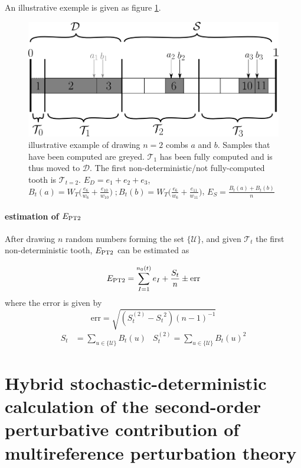 \documentclass[./thesis.tex]{subfiles}
\begin{document}
An illustrative exemple is given as figure \ref{fig:toothindet}.

 \begin{figure}[h!]
	\begin{center}
		\includegraphics[width=0.9\columnwidth]{figures/pt2/toothindet}
	\end{center}
		\caption{illustrative example of drawing $n=2$ combs $a$ and $b$.	Samples that have been computed are greyed. $\mathcal{T}_1$ has been fully computed and is thus moved to $\mathcal{D}$. The first non-deterministic/not fully-computed tooth is $\mathcal{T}_{t=2}$.
		$ E_D = e_1 + e_2 + e_3 $, 
		$B_t(a) = W_T \Big ( \frac{e_6}{w_6} + \frac{e_{10}}{w_{10}} \Big ) \;;B_t(b) = W_T \Big ( \frac{e_6}{w_6} + \frac{e_{11}}{w_{11}} \Big )$, 
		$E_S = \frac{B_t(a)+B_t(b)}{n}$}
		\label{fig:toothindet}
\end{figure}

\paragraph{estimation of $E_\text{PT2}$}

After drawing $n$ random numbers forming the set $\{\mathcal{U}\}$, and given $\mathcal{T}_t$ the first non-deterministic tooth, $E_\text{PT2}$ can be estimated as 

\begin{equation}
E_\text{PT2} = \sum_{I=1}^{n_0(t)} e_I + \frac{S_{t}}{n}  \pm \text{err}
\end{equation}
where the error is given by
\begin{equation}
\text{err}  = \sqrt{(S_{t}^{(2)} - {S_{t}}^2) (n-1)^{-1} } 
\end{equation}
\begin{align}
S_{t} & = \sum_{u \in \{\mathcal{U}\}} B_{t}(u) & 
S^{(2)}_{t} = \sum_{u \in \{\mathcal{U}\}} B_{t}(u)^2
\end{align}

\clearpage

\section{Hybrid stochastic-deterministic calculation of the second-order
perturbative contribution of multireference perturbation theory}

\end{document}
